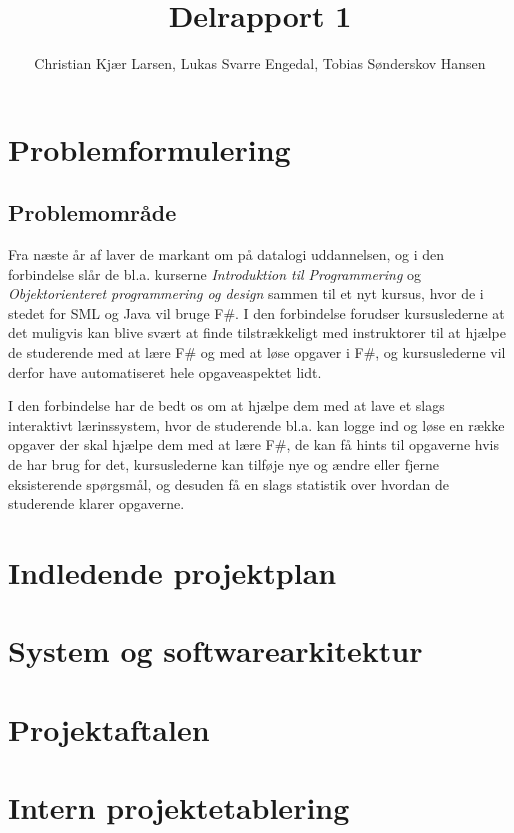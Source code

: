 \documentclass[12pt]{article}
\title{Delrapport 1}
\author{Christian Kjær Larsen, Lukas Svarre Engedal, Tobias Sønderskov Hansen}
\begin{document}
\maketitle

\section{Problemformulering}
\subsection{Problemområde}
Fra næste år af laver de markant om på datalogi uddannelsen, og i den forbindelse slår de bl.a. kurserne \emph{Introduktion til Programmering} og \emph{Objektorienteret programmering og design} sammen til et nyt kursus, hvor de i stedet for SML og Java vil bruge F\#. I den forbindelse forudser kursuslederne at det muligvis kan blive svært at finde tilstrækkeligt med instruktorer til at hjælpe de studerende med at lære F\# og med at løse opgaver i F\#, og kursuslederne vil derfor have automatiseret hele opgaveaspektet lidt.
 
I den forbindelse har de bedt os om at hjælpe dem med at lave et slags interaktivt lærinssystem, hvor de studerende bl.a. kan logge ind og løse en række opgaver der skal hjælpe dem med at lære F\#, de kan få hints til opgaverne hvis de har brug for det, kursuslederne kan tilføje nye og  ændre eller fjerne eksisterende spørgsmål, og desuden få en slags statistik over hvordan de studerende klarer opgaverne.
\section{Indledende projektplan}
\section{System og softwarearkitektur}
\section{Projektaftalen}
\section{Intern projektetablering}
\end{document}
